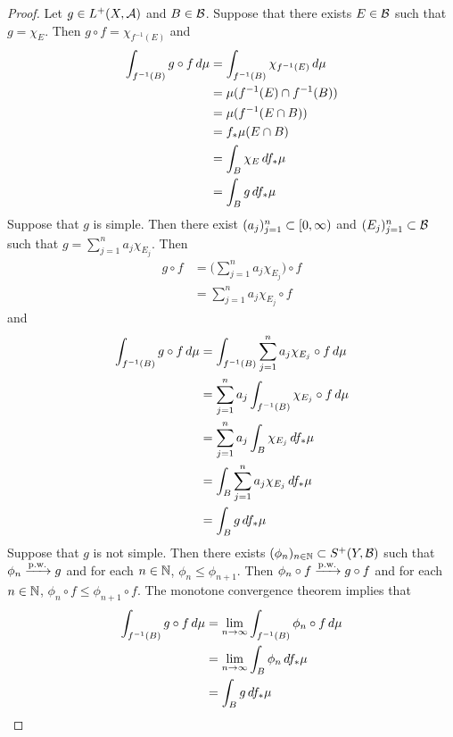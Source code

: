 \documentclass{book}
\begin{document}
	\begin{proof}
		Let $g \in  L^+(X, \mathcal{A})$ and $B \in \mathcal{B}$. Suppose that there exists $E \in \mathcal{B}$ such that $g = \chi_E$. Then $g \circ f = \chi_{f^{-1}(E)}$ and
		\begin{align*}
			\int_{f^{-1}(B)} g \circ f \, d \mu
			& = \int_{f^{-1}(B)} \chi_{f^{-1}(E)} \, d \mu \\
			& = \mu(f^{-1}(E) \cap f^{-1}(B)) \\
			& = \mu( f^{-1}(E \cap B)) \\
			& = f_*\mu (E \cap B) \\
			& = \int_{B} \chi_{E} \, df_*\mu \\
			& = \int_{B} g \, df_*\mu 
 		\end{align*}
 		Suppose that $g$ is simple. Then there exist $(a_j)_{j=1}^n \subset [0,\infty)$ and $(E_j)_{j=1}^n \subset \mathcal{B}$ such that $g = \sum\limits_{j=1}^n a_j \chi_{E_j}$. 
 		Then 
 		\begin{align*}
 			g \circ f 
 			& = \bigg( \sum\limits_{j=1}^n a_j \chi_{E_j} \bigg) \circ f\\
 			& = \sum\limits_{j=1}^n a_j \chi_{E_j} \circ f
 		\end{align*}
 		and 
 		\begin{align*}
 			\int_{f^{-1}(B)} g \circ f \, d \mu
 			& = \int_{f^{-1}(B)} \sum\limits_{j=1}^n a_j \chi_{E_j} \circ f \, d \mu \\
 			& = \sum\limits_{j=1}^n a_j \int_{f^{-1}(B)} \chi_{E_j} \circ f \, d \mu \\
 			& = \sum\limits_{j=1}^n a_j \int_{B} \chi_{E_j} \, d f_*\mu \\
 			& = \int_{B} \sum\limits_{j=1}^n a_j  \chi_{E_j} \, d f_*\mu \\
 			& = \int_{B} g \, d f_*\mu \\
 		\end{align*}
 		Suppose that $g$ is not simple. Then there exists $(\phi_n)_{n \in \mathbb{N}} \subset S^+(Y, \mathcal{B})$ such that $\phi_n \xrightarrow{\text{p.w.}} g$ and for each $n \in \mathbb{N}$, $\phi_n \leq \phi_{n+1}$. Then $\phi_n \circ f \xrightarrow{\text{p.w.}} g \circ f$ and for each $n \in \mathbb{N}$, $\phi_n \circ f \leq \phi_{n+1} \circ f$. The monotone convergence theorem implies that 
 		\begin{align*}
 			\int_{f^{-1}(B)} g \circ f \, d \mu
 			& = \lim \limits_{n \rightarrow \infty} \int_{f^{-1}(B)} \phi_n \circ f \, d \mu \\
 			& = \lim \limits_{n \rightarrow \infty} \int_{B} \phi_n \, d f_*\mu \\
 			& = \int_{B} g \, d f_*\mu \\
 		\end{align*}
	\end{proof}
\end{document}
